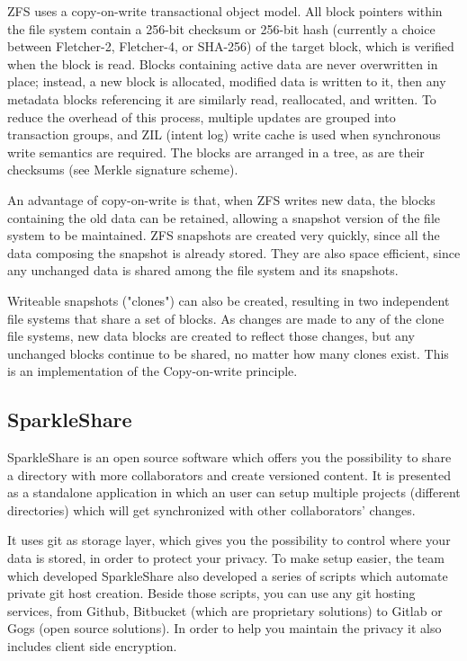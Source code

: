         ZFS uses a copy-on-write transactional object model. All block pointers within the file system contain a 256-bit checksum or 256-bit hash (currently a choice between Fletcher-2, Fletcher-4, or SHA-256) of the target block, which is verified when the block is read. Blocks containing active data are never overwritten in place; instead, a new block is allocated, modified data is written to it, then any metadata blocks referencing it are similarly read, reallocated, and written. To reduce the overhead of this process, multiple updates are grouped into transaction groups, and ZIL (intent log) write cache is used when synchronous write semantics are required. The blocks are arranged in a tree, as are their checksums (see Merkle signature scheme).
        
        An advantage of copy-on-write is that, when ZFS writes new data, the blocks containing the old data can be retained, allowing a snapshot version of the file system to be maintained. ZFS snapshots are created very quickly, since all the data composing the snapshot is already stored. They are also space efficient, since any unchanged data is shared among the file system and its snapshots.

        Writeable snapshots ("clones") can also be created, resulting in two independent file systems that share a set of blocks. As changes are made to any of the clone file systems, new data blocks are created to reflect those changes, but any unchanged blocks continue to be shared, no matter how many clones exist. This is an implementation of the Copy-on-write principle.
        
    \subsection{SparkleShare}
        SparkleShare is an open source software which offers you the possibility to share a directory with more collaborators and create versioned content. It is presented as a standalone application in which an user can setup multiple projects (different directories) which will get synchronized with other collaborators' changes.
        
        It uses git as storage layer, which gives you the possibility to control where your data is stored, in order to protect your privacy. To make setup easier, the team which developed SparkleShare also developed a series of scripts which automate private git host creation. Beside those scripts, you can use any git hosting services, from Github, Bitbucket (which are proprietary solutions) to Gitlab or Gogs (open source solutions).
        In order to help you maintain the privacy it also includes client side encryption.
        
